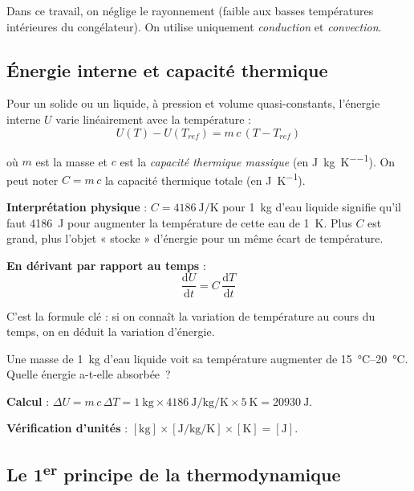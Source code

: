 \documentclass[11pt,a4paper]{article}
\begin{document}
Dans ce travail, on néglige le rayonnement (faible aux basses températures intérieures du
congélateur). On utilise uniquement \emph{conduction} et \emph{convection}.

\subsection{Énergie interne et capacité thermique}

\begin{rappel}
Pour un solide ou un liquide, à pression et volume quasi-constants, l'énergie interne $U$
varie linéairement avec la température :
\begin{equation}
U(T) - U(T_{ref}) = m\,c\,(T - T_{ref})
\end{equation}

où $m$ est la masse et $c$ est la \emph{capacité thermique massique} (en
\si{\joule\per\kilogram\per\kelvin}). On peut noter $C = m\,c$ la capacité thermique
totale (en \si{\joule\per\kelvin}).
\end{rappel}

\textbf{Interprétation physique} : $C = \SI{4186}{\joule\per\kelvin}$ pour \SI{1}{\kilogram}
d'eau liquide signifie qu'il faut \SI{4186}{\joule} pour augmenter la température de cette
eau de \SI{1}{\kelvin}. Plus $C$ est grand, plus l'objet « stocke » d'énergie pour un même
écart de température.

\textbf{En dérivant par rapport au temps} :
\begin{equation}
\frac{\mathrm{d}U}{\mathrm{d}t} = C\,\frac{\mathrm{d}T}{\mathrm{d}t}
\label{eq:dUdt}
\end{equation}

C'est la formule clé : si on connaît la variation de température au cours du temps, on en
déduit la variation d'énergie.

\begin{exemple}
Une masse de \SI{1}{\kilogram} d'eau liquide voit sa température augmenter de
\SIrange{15}{20}{\celsius}. Quelle énergie a-t-elle absorbée~?
\medskip

\textbf{Calcul} : $\Delta U = m\,c\,\Delta T = \SI{1}{\kilogram} \times
\SI{4186}{\joule\per\kilogram\per\kelvin} \times \SI{5}{\kelvin} = \SI{20930}{\joule}$.

\textbf{Vérification d'unités} :
$[\si{\kilogram}] \times [\si{\joule\per\kilogram\per\kelvin}] \times [\si{\kelvin}]
= [\si{\joule}]$. \checkmark
\end{exemple}

\subsection{Le 1\textsuperscript{er} principe de la thermodynamique}
\end{document}
